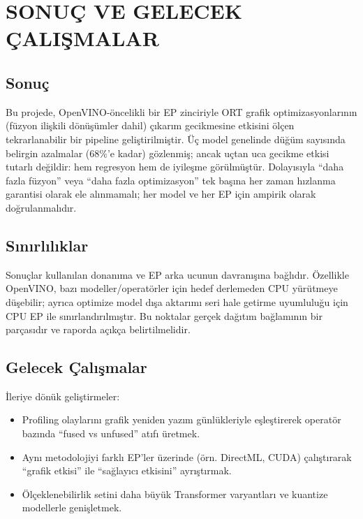\chapter{SONUÇ VE GELECEK ÇALIŞMALAR}

\section{Sonuç}
Bu projede, OpenVINO-öncelikli bir EP zinciriyle ORT grafik optimizasyonlarının (füzyon ilişkili dönüşümler dahil) çıkarım gecikmesine etkisini ölçen tekrarlanabilir bir pipeline geliştirilmiştir.
Üç model genelinde düğüm sayısında belirgin azalmalar (\(68\%\)'e kadar) gözlenmiş; ancak uçtan uca gecikme etkisi tutarlı değildir: hem regresyon hem de iyileşme görülmüştür.
Dolayısıyla “daha fazla füzyon” veya “daha fazla optimizasyon” tek başına her zaman hızlanma garantisi olarak ele alınmamalı; her model ve her EP için ampirik olarak doğrulanmalıdır.

\section{Sınırlılıklar}
Sonuçlar kullanılan donanıma ve EP arka ucunun davranışına bağlıdır.
Özellikle OpenVINO, bazı modeller/operatörler için hedef derlemeden CPU yürütmeye düşebilir; ayrıca optimize model dışa aktarımı seri hale getirme uyumluluğu için CPU EP ile sınırlandırılmıştır.
Bu noktalar gerçek dağıtım bağlamının bir parçasıdır ve raporda açıkça belirtilmelidir.

\section{Gelecek Çalışmalar}
İleriye dönük geliştirmeler:
\begin{itemize}
	\item Profiling olaylarını grafik yeniden yazım günlükleriyle eşleştirerek operatör bazında “fused vs unfused” atıfı üretmek.
	\item Aynı metodolojiyi farklı EP'ler üzerinde (örn. DirectML, CUDA) çalıştırarak “grafik etkisi” ile “sağlayıcı etkisini” ayrıştırmak.
	\item Ölçeklenebilirlik setini daha büyük Transformer varyantları ve kuantize modellerle genişletmek.
\end{itemize}